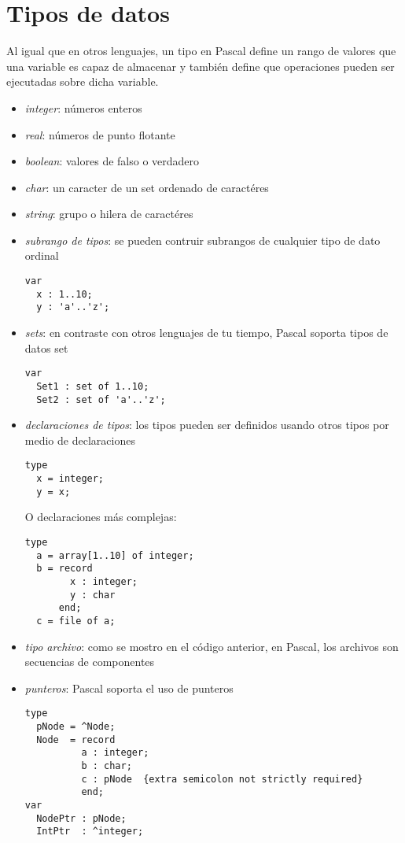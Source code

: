 \documentclass{IEEEtran}
\begin{document}
\section{Tipos de datos}
Al igual que en otros lenguajes, un tipo en Pascal define un rango de valores que una variable es capaz de almacenar y tambi\'en define que operaciones pueden ser ejecutadas sobre dicha variable.
\begin{itemize}
\item \emph{integer}: n\'umeros enteros
\item \emph{real}: n\'umeros de punto flotante
\item \emph{boolean}: valores de falso o verdadero
\item \emph{char}: un caracter de un set ordenado de caract\'eres
\item \emph{string}: grupo o hilera de caract\'eres
\item \emph{subrango de tipos}: se pueden contruir subrangos de cualquier tipo de dato ordinal
\begin{lstlisting}
var
  x : 1..10;
  y : 'a'..'z';
\end{lstlisting}
\item \emph{sets}: en contraste con otros lenguajes de tu tiempo, Pascal soporta tipos de datos set
\begin{lstlisting}
var
  Set1 : set of 1..10;
  Set2 : set of 'a'..'z';
\end{lstlisting}
\item \emph{declaraciones de tipos}: los tipos pueden ser definidos usando otros tipos por medio de declaraciones
\begin{lstlisting}
type
  x = integer;
  y = x;
\end{lstlisting}
O declaraciones m\'as complejas:
\begin{lstlisting}
type
  a = array[1..10] of integer;
  b = record
        x : integer;
        y : char
      end;
  c = file of a;
\end{lstlisting}
\item \emph{tipo archivo}: como se mostro en el c\'odigo anterior, en Pascal, los archivos son secuencias de componentes
\item \emph{punteros}: Pascal soporta el uso de punteros
\begin{lstlisting}
type
  pNode = ^Node;
  Node  = record
          a : integer;
          b : char;
          c : pNode  {extra semicolon not strictly required}
          end;
var
  NodePtr : pNode;
  IntPtr  : ^integer;
\end{lstlisting}
\end{itemize}
\end{document}

